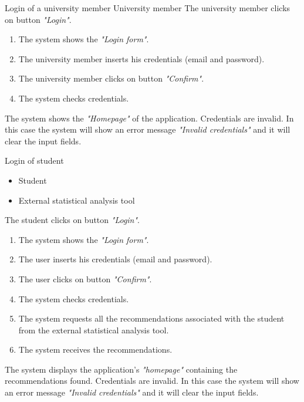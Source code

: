 \usecase
{Login of a university member}
{
    University member
}
{
    The university member clicks on button \textit{"Login"}.
}
{
    \begin{enumerate}
        \item The system shows the \textit{"Login form"}.
        \item The university member inserts his credentials (email and password).
        \item The university member clicks on button \textit{"Confirm"}.
        \item The system checks credentials.
    \end{enumerate}
}
{
    The system shows the \textit{"Homepage"} of the application.
}
{
    Credentials are invalid. In this case the system will show an error message \textit{"Invalid credentials"} and it will clear the input fields.
}
{

}

\usecase
{Login of student}
{
    \begin{itemize}
        \item Student
        \item External statistical analysis tool
    \end{itemize}
}
{
    The student clicks on button \textit{"Login"}.
}
{
    \begin{enumerate}
        \item The system shows the \textit{"Login form"}.
        \item The user inserts his credentials (email and password).
        \item The user clicks on button \textit{"Confirm"}.
        \item The system checks credentials.
        \item The system requests all the recommendations associated with the student from the external statistical analysis tool.
        \item The system receives the recommendations.
    \end{enumerate}
}
{
    The system displays the application's \textit{"homepage"} containing the recommendations found.
}
{
    Credentials are invalid. In this case the system will show an error message \textit{"Invalid credentials"} and it will clear the input fields.
}
{

}

